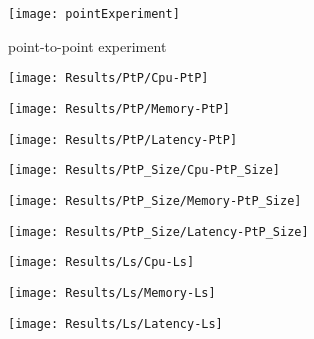 \begin{figure}[htbp]
    \centering
    \texttt{[image: pointExperiment]}
    \caption{point-to-point experiment}
    \label{fig:point}
\end{figure}



\begin{figure}[htbp]
    \centering
    \texttt{[image: Results/PtP/Cpu-PtP]}
    \label{fig:cpuPtp}
\end{figure}

\begin{figure}[htbp]
    \centering
    \texttt{[image: Results/PtP/Memory-PtP]}
    \label{fig:gantt}
\end{figure}

\begin{figure}[htbp]
    \centering
    \texttt{[image: Results/PtP/Latency-PtP]}
    \label{fig:gantt}
\end{figure}

\begin{figure}[htbp]
    \centering
    \texttt{[image: Results/PtP\_Size/Cpu-PtP\_Size]}
    \label{fig:gantt}
\end{figure}

\begin{figure}[htbp]
    \centering
    \texttt{[image: Results/PtP\_Size/Memory-PtP\_Size]}
    \label{fig:gantt}
\end{figure}

\begin{figure}[htbp]
    \centering
    \texttt{[image: Results/PtP\_Size/Latency-PtP\_Size]}
    \label{fig:gantt}
\end{figure}

\begin{figure}[htbp]
    \centering
    \texttt{[image: Results/Ls/Cpu-Ls]}
    \label{fig:gantt}
\end{figure}

\begin{figure}[htbp]
    \centering
    \texttt{[image: Results/Ls/Memory-Ls]}
    \label{fig:gantt}
\end{figure}

\begin{figure}[htbp]
    \centering
    \texttt{[image: Results/Ls/Latency-Ls]}
    \label{fig:gantt}
\end{figure}

\newpage


